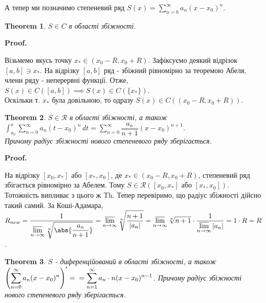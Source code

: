 \documentclass[a4paper, 10pt]{article}
\makeatletter
\DeclareMathOperator*\uplim{\overline{lim}}
\def\huge{\displaystyle}
\def\qed{$\blacksquare$}
\theoremstyle{theoremdd}
\newtheorem{theorem}{Theorem}[subsection]
\theoremstyle{theoremdd}
\theoremstyle{theoremdd}
\theoremstyle{theoremdd}
\theoremstyle{theoremdd}
\theoremstyle{theoremdd}
\theoremstyle{theoremdd}
\theoremstyle{theoremdd}
\theoremstyle{theoremdd}
\renewenvironment{proof}[1][Proof.\\]{\par
\pushQED{\hfill \qed}%
\normalfont \topsep6\p@\@plus6\p@\relax
\trivlist
\item\relax
{\bfseries
#1\@addpunct{.}}\hspace\labelsep\ignorespaces
}{%
\popQED\endtrivlist\@endpefalse
}
\makeatother
\begin{document}
А тепер ми позначимо степеневий ряд $\huge S(x) = \sum_{n=0}^\infty a_n(x-x_0)^n$.

\begin{theorem}
$S \in C$ в області збіжності.
\end{theorem}

\begin{proof}
Візьмемо якусь точку $x_* \in (x_0-R,x_0+R)$. Зафіксуємо деякий відрізок $[a,b] \ni x_*$. На відрізку $[a,b]$ ряд - збіжний рівномірно за теоремою Абеля, члени ряду - неперервні функції. Отже, $S(x) \in C([a,b]) \implies S(x) \in C(\{x_*\})$.\\
Оскільки т. $x_*$ була довільною, то одразу $S(x) \in C((x_0-R, x_0+R))$.
\end{proof}

\begin{theorem}
$S \in \mathcal{R}$ в області збіжності, а також $\huge\int_{x_0}^x \huge\sum_{n=0}^\infty a_n (t-x_0)^n\,dt = \sum_{n=0}^\infty \dfrac{a_n}{n+1}(x-x_0)^{n+1}$. \\ Причому радіус збіжності нового степеневого ряду зберігається.
\end{theorem}

\begin{proof}
На відрізку $[x_0,x_*]$ або $[x_*,x_0]$, де $x_* \in (x_0-R,x_0+R)$, степеневий ряд збігається рівномірно за Абелем. Тому $S \in \mathcal{R}([x_0,x_*] \text{ або } [x_*,x_0])$. Тотожність випливає з цього ж Th. Тепер перевіримо, що радіус збіжності дійсно такий самий. За Коші-Адамара,\\
$R_{new} = \huge \dfrac{1}{\huge\uplim_{n \to \infty} \sqrt[n]{\abs{\dfrac{a_n}{n+1}}} } = \uplim_{n \to \infty} \sqrt[n]{\dfrac{n+1}{|a_n|}} = \uplim_{n \to \infty} \sqrt[n]{n+1} \cdot \dfrac{1}{\huge\uplim_{n \to \infty} |a_n|} = 1 \cdot R = R$.
\end{proof}

\begin{theorem}
$S$ - диференційований в області збіжності, а також $\huge \left( \sum_{n=0}^\infty a_n(x-x_0)^n \right)' = \\ = \sum_{n=1}^\infty a_n\cdot n(x-x_0)^{n-1}$. Причому радіус збіжності нового степеневого ряду зберігається.
\end{theorem}
\end{document}
